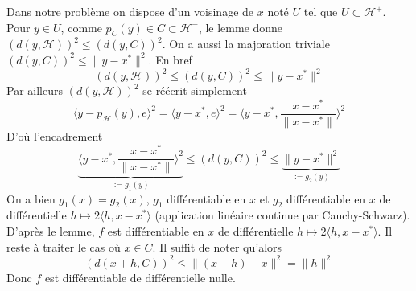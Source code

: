 \documentclass{report}
\begin{document}
\noindent Dans notre problème on dispose d'un voisinage de $x$ noté $U$ tel que $U\subset \mathcal H^+$. Pour $y\in U$, comme $p_C(y)\in C\subset \mathcal  H^-$, le lemme donne $(d(y,\mathcal H))^2\leq (d(y,C))^2$. On a aussi la majoration triviale $(d(y,C))^2\leq \|y-x^*\|^2$. En bref $$(d(y,\mathcal H))^2\leq (d(y,C))^2\leq \|y-x^*\|^2$$
Par ailleurs $(d(y,\mathcal H))^2$ se réécrit simplement $$\langle y-p_{\mathcal H}(y),e\rangle^2  = \langle y-x^*,e\rangle^2 = \langle y-x^*,\frac{x-x^*}{\|x-x^*\|}\rangle^2 $$
D'où l'encadrement $$\underbrace{\langle y-x^*,\frac{x-x^*}{\|x-x^*\|}\rangle^2}_{:= g_1(y)}\leq (d(y,C))^2\leq \underbrace{\|y-x^*\|^2}_{:= g_2(y)}$$
On a bien $g_1(x)=g_2(x)$, $g_1$ différentiable en $x$ et $g_2$ différentiable en $x$ de différentielle $h\mapsto 2\langle h,x-x^* \rangle$ (application linéaire continue par Cauchy-Schwarz).\newline
D'après le lemme, $f$ est différentiable en $x$ de différentielle $h\mapsto 2\langle h,x-x^* \rangle$.\newline \newline
Il reste à traiter le cas où $x\in C$. Il suffit de noter qu'alors $$(d(x+h,C))^2\leq \|(x+h)-x\|^2=\|h\|^2$$
Donc $f$ est différentiable de différentielle nulle.

\subsection{} \noindent\fbox{
\parbox{\linewidth}{

}}\\ 
\\ 
\\
\noindent

\newpage
\end{document}
